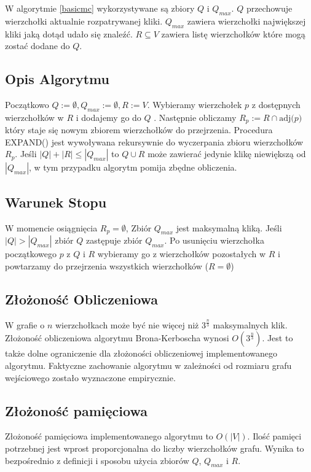 \documentclass[12pt, a4paper]{article}
\begin{document}
W algorytmie \ref{basicmc} wykorzystywane są zbiory $Q$ i $Q_{max}$. $Q$ przechowuje wierzchołki aktualnie rozpatrywanej kliki. $Q_{max}$ zawiera wierzchołki największej kliki jaką dotąd udało się znaleźć. $R \subseteq V $ zawiera listę wierzchołków które mogą zostać dodane do $Q$.

\subsection{Opis Algorytmu}

Początkowo $Q := \emptyset, Q_{max} := \emptyset, R := V$. Wybieramy wierzchołek $p$ z dostępnych wierzchołków w $R$ i dodajemy go do $Q$ . Następnie obliczamy $R_{p} := R \cap \text{adj(}p\text{)}$ który staje się nowym zbiorem wierzchołków do przejrzenia. Procedura EXPAND() jest wywoływana rekursywnie do wyczerpania zbioru wierzchołków $R_{p}$. Jeśli $|Q|+|R| \leq |Q_{max}|$ to $Q \cup R$ może zawierać jedynie klikę niewiększą od $|Q_{max}|$, w tym przypadku algorytm pomija zbędne obliczenia.

\subsection{Warunek Stopu}

W momencie osiągnięcia $R_{p} = \emptyset$, Zbiór $Q_{max}$ jest maksymalną kliką. Jeśli $|Q| > |Q_{max}|$ zbiór $Q$ zastępuje zbiór $Q_{max}$. Po usunięciu wierzchołka początkowego $p$ z $Q$ i $R$ wybieramy go z wierzchołków pozostałych w $R$ i powtarzamy do przejrzenia wszystkich wierzchołków ($R = \emptyset$)

\subsection{Złożoność Obliczeniowa}
W grafie o $n$ wierzchołkach może być nie więcej niż $3^{\frac{n}{3}}$ maksymalnych klik. Złożoność obliczeniowa algorytmu Brona-Kerboscha wynosi $O(3^{\frac{n}{3}})$.
Jest to także dolne ograniczenie dla złożoności obliczeniowej implementowanego algorytmu. Faktyczne zachowanie algorytmu w zależności od rozmiaru grafu wejściowego zostało wyznaczone empirycznie.

\subsection{Złożoność pamięciowa}
\label{memory_complexity}

Złożoność pamięciowa implementowanego algorytmu to $O(|V|)$. Ilość pamięci potrzebnej jest wprost proporcjonalna do liczby wierzchołków grafu. Wynika to bezpośrednio z definicji i sposobu użycia zbiorów $Q$, $Q_{max}$ i $R$.
\end{document}
